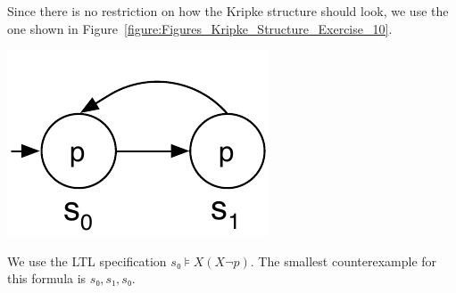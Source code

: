 Since there is no restriction on how the Kripke structure should look, we use
the one shown in Figure~\ref{figure:Figures_Kripke_Structure_Exercise_10}.

\begin{minipage}[t]{0.45\textwidth}
    \centering
    \includegraphics[width=.6\textwidth]
        {Figures/Kripke Structure Exercise 10.pdf}
    \label{figure:Figures_Kripke_Structure_Exercise_10}
\end{minipage}
\begin{minipage}[t]{0.45\textwidth}
    \vskip 1cm
    We use the LTL specification $s₀⊧X(X¬p)$. The smallest counterexample for
    this formula is $s₀, s₁, s₀$.
\end{minipage}
